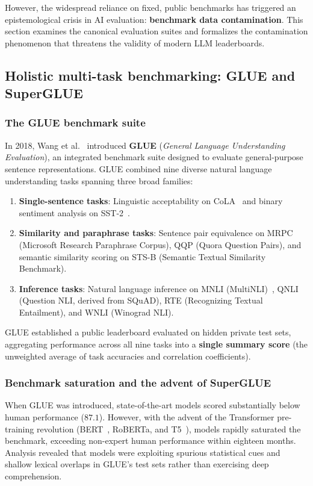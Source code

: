 \documentclass[../../main.tex]{subfiles}
\begin{document}
However, the widespread reliance on fixed, public benchmarks has triggered an epistemological crisis in AI evaluation: \textbf{benchmark data contamination}. This section examines the canonical evaluation suites and formalizes the contamination phenomenon that threatens the validity of modern LLM leaderboards.

\subsection{Holistic multi-task benchmarking: GLUE and SuperGLUE}
\label{subsec:glue_superglue}

\subsubsection{The GLUE benchmark suite}
In 2018, Wang et al.~\cite{wang2018glue} introduced \textbf{GLUE} (\textit{General Language Understanding Evaluation}), an integrated benchmark suite designed to evaluate general-purpose sentence representations. GLUE combined nine diverse natural language understanding tasks spanning three broad families:
\begin{enumerate}
    \item \textbf{Single-sentence tasks}: Linguistic acceptability on CoLA~\cite{warstadt2019cola} and binary sentiment analysis on SST-2~\cite{socher2013sst}.
    \item \textbf{Similarity and paraphrase tasks}: Sentence pair equivalence on MRPC (Microsoft Research Paraphrase Corpus), QQP (Quora Question Pairs), and semantic similarity scoring on STS-B (Semantic Textual Similarity Benchmark).
    \item \textbf{Inference tasks}: Natural language inference on MNLI (MultiNLI)~\cite{williams2018multinli}, QNLI (Question NLI, derived from SQuAD), RTE (Recognizing Textual Entailment), and WNLI (Winograd NLI).
\end{enumerate}
GLUE established a public leaderboard evaluated on hidden private test sets, aggregating performance across all nine tasks into a \textbf{single summary score} (the unweighted average of task accuracies and correlation coefficients).

\subsubsection{Benchmark saturation and the advent of SuperGLUE}
When GLUE was introduced, state-of-the-art models scored substantially below human performance ($87.1$). However, with the advent of the Transformer pre-training revolution (BERT~\cite{devlin2019}, RoBERTa, and T5~\cite{raffel2020t5}), models rapidly saturated the benchmark, exceeding non-expert human performance within eighteen months. Analysis revealed that models were exploiting spurious statistical cues and shallow lexical overlaps in GLUE's test sets rather than exercising deep comprehension.
\end{document}
